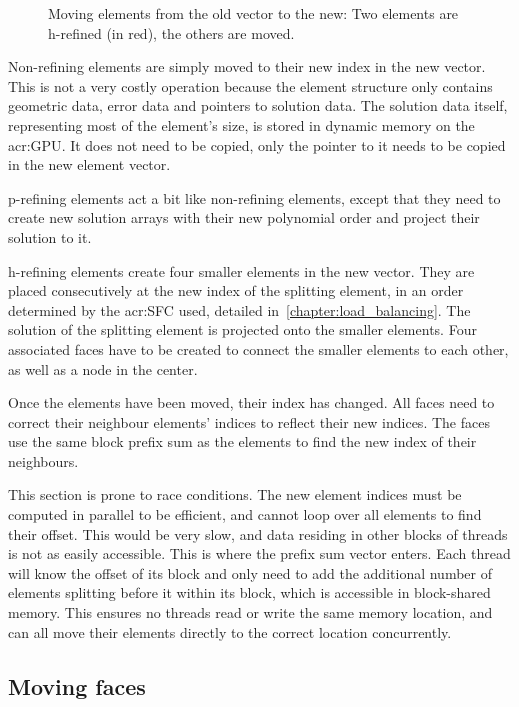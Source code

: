 \begin{figure}[H]
	\centering
	
	\caption{Moving elements from the old vector to the new: Two elements are h-refined (in red), the others are moved.}\label{fig:refinement_offset}
\end{figure}

Non-refining elements are simply moved to their new index in the new vector. This is not a very
costly operation because the element structure only contains geometric data, error data and pointers
to solution data. The solution data itself, representing most of the element's size, is stored in
dynamic memory on the \acrshort{acr:GPU}. It does not need to be copied, only the pointer to it
needs to be copied in the new element vector. 

\noindent
p-refining elements act a bit like non-refining elements, except that they need to create new
solution arrays with their new polynomial order and project their solution to it.

\noindent
h-refining elements create four smaller elements in the new vector. They are placed consecutively at
the new index of the splitting element, in an order determined by the \acrfull{acr:SFC} used,
detailed in~\ref{chapter:load_balancing}. The solution of the splitting element is projected onto
the smaller elements. Four associated faces have to be created to connect the smaller elements to
each other, as well as a node in the center. 

Once the elements have been moved, their index has changed. All faces need to correct their
neighbour elements' indices to reflect their new indices. The faces use the same block prefix sum as
the elements to find the new index of their neighbours.

This section is prone to race conditions. The new element indices must be computed in parallel to be
efficient, and cannot loop over all elements to find their offset. This would be very slow, and data
residing in other blocks of threads is not as easily accessible. This is where the prefix sum vector
enters. Each thread will know the offset of its block and only need to add the additional number of
elements splitting before it within its block, which is accessible in block-shared memory. This
ensures no threads read or write the same memory location, and can all move their elements directly
to the correct location concurrently.

\subsection{Moving faces}\label{subsection:adaptive_mesh_refinement:implementation:moving_faces}


